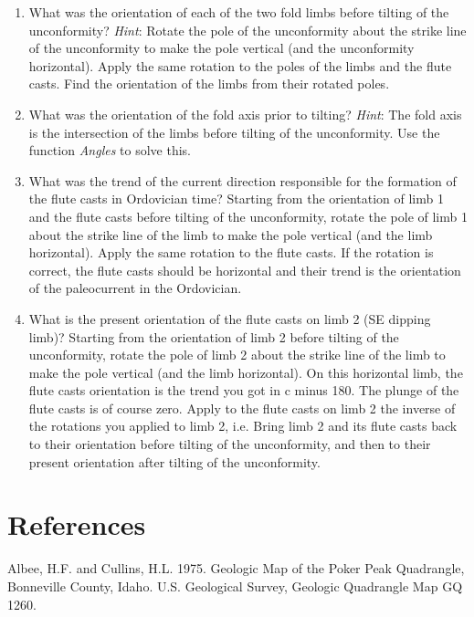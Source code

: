 \documentclass[a4paper , 12pt]{book}
\begin{document}
\begin{enumerate}
    \begin{enumerate}
        \item What was the orientation of each of the two fold limbs before tilting of the unconformity? \textit{Hint}: Rotate the pole of the unconformity about the strike line of the unconformity to make the pole vertical (and the unconformity horizontal). Apply the same rotation to the poles of the limbs and the flute casts. Find the orientation of the limbs from their rotated poles.
        \item What was the orientation of the fold axis prior to tilting? \textit{Hint}: The fold axis is the intersection of the limbs before tilting of the unconformity. Use the function \textit{Angles} to solve this. 
        \item What was the trend of the current direction responsible for the formation of the flute casts in Ordovician time? Starting from the orientation of limb 1 and the flute casts before tilting of the unconformity, rotate the pole of limb 1 about the strike line of the limb to make the pole vertical (and the limb horizontal). Apply the same rotation to the flute casts. If the rotation is correct, the flute casts should be horizontal and their trend is the orientation of the paleocurrent in the Ordovician.
        \item What is the present orientation of the flute casts on limb 2 (SE dipping limb)? Starting from the orientation of limb 2 before tilting of the unconformity, rotate the pole of limb 2 about the strike line of the limb to make the pole vertical (and the limb horizontal). On this horizontal limb, the flute casts orientation is the trend you got in c minus 180\degree. The plunge of the flute casts is of course zero. Apply to the flute casts on limb 2 the inverse of the rotations you applied to limb 2, i.e. Bring limb 2 and its flute casts back to their orientation before tilting of the unconformity, and then to their present orientation after tilting of the unconformity.
    \end{enumerate}{}
    
\end{enumerate}

\section*{References}

Albee, H.F. and Cullins, H.L. 1975. Geologic Map of the Poker Peak Quadrangle, Bonneville County, Idaho. U.S. Geological Survey, Geologic Quadrangle Map GQ 1260. 
\end{document}
